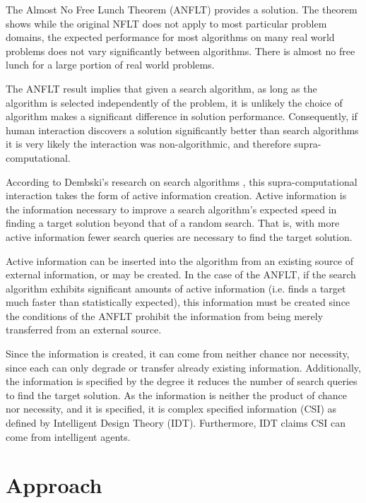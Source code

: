 The Almost No Free Lunch Theorem (ANFLT) \cite{droste02:_optim_with_random_searc_heuris} provides a solution.   The theorem shows while the original NFLT does not apply to most particular problem domains, the expected performance for most algorithms on many real world problems does not vary significantly between algorithms.  There is almost no free lunch for a large portion of real world problems. 

The ANFLT result implies that given a search algorithm, as long as the algorithm is selected independently of the problem, it is unlikely the choice of algorithm  makes a significant difference in solution performance.  Consequently, if human interaction discovers a solution significantly better than search algorithms it is very likely the interaction was non-algorithmic, and therefore supra-computational.

According to Dembski's research on search algorithms \cite{dembski10:_searc_for_searc}, this supra-computational interaction takes the form of active information creation.  Active information is the information necessary to improve a search algorithm's expected speed in finding a target solution beyond that of a random search.  That is, with more active information fewer search queries are necessary to find the target solution.   

Active information can be inserted into the algorithm from an existing source of external information, or may be created.  In the case of the ANFLT, if the search algorithm exhibits significant amounts of active information (i.e. finds a target much faster than statistically expected), this information must be created since the conditions of the ANFLT prohibit the information from being merely transferred from an external source.  

Since the information is created, it can come from neither chance nor necessity, since each can only degrade or transfer already existing information.  Additionally, the information is specified by the degree it reduces the number of search queries to find the target solution.  As the information is neither the product of chance nor necessity, and it is specified, it is complex specified information (CSI) \cite{dembski:_specif} as defined by Intelligent Design Theory (IDT).  Furthermore, IDT claims CSI can come from intelligent agents.

\section{Approach}\label{sec:solution-approach}

